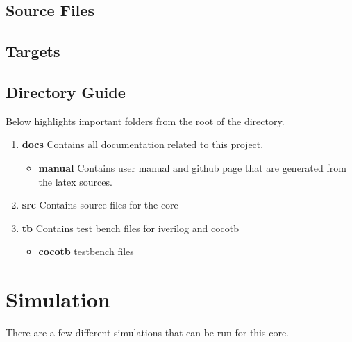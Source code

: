 \subsection{Source Files}







\subsection{Targets}







\subsection{Directory Guide}

\par
Below highlights important folders from the root of the directory.

\begin{enumerate}
  \item \textbf{docs} Contains all documentation related to this project.
    \begin{itemize}
      \item \textbf{manual} Contains user manual and github page that are generated from the latex sources.
    \end{itemize}
  \item \textbf{src} Contains source files for the core
  \item \textbf{tb} Contains test bench files for iverilog and cocotb
    \begin{itemize}
      \item \textbf{cocotb} testbench files
    \end{itemize}
\end{enumerate}

\newpage

\section{Simulation}
\par
There are a few different simulations that can be run for this core.

